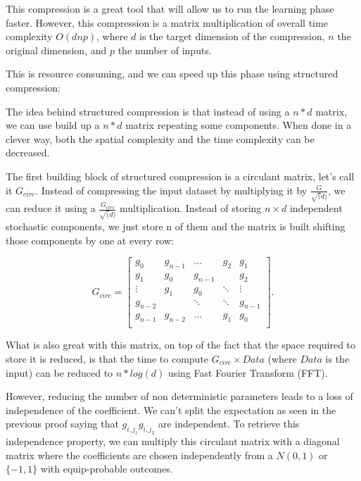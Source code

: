 \documentclass[11pt,a4paper]{article}
\begin{document}
	
	This compression is a great tool that will allow us to run the learning phase faster. However, this compression is a matrix multiplication of overall time complexity $O(dnp)$, where $d$ is the target dimension of the compression, $n$ the original dimension, and $p$ the number of inputs.  
	
	This is resource consuming, and we can speed up this phase using structured compression:
	
	The idea behind structured compression is that instead of using a $n*d$ matrix, we can use build up a $n*d$ matrix repeating some components. When done in a clever way, both the spatial complexity and the time complexity can be decreased.
	
	The first building block of structured compression is a circulant matrix, let's call it $G_{circ}$. Instead of compressing the input dataset by multiplying it by $\frac{G}{\sqrt(d)}$, we can reduce it using a $\frac{G_{circ}}{\sqrt(d)}$ multiplication. Instead of storing $n \times d$ independent stochastic components, we just store n of them and the matrix is built shifting those components by one at every row: 
	
	\begin{equation*}
        G_{circ}=
        \begin{bmatrix}
        g_0     & g_{n-1} & \dots  & g_{2} & g_{1}  \\
        g_{1} & g_0    & g_{n-1} &         & g_{2}  \\
        \vdots  & g_{1}& g_0    & \ddots  & \vdots   \\
        g_{n-2}  &        & \ddots & \ddots  & g_{n-1}   \\
        g_{n-1}  & g_{n-2} & \dots  & g_{1} & g_0 \\
        \end{bmatrix}.
	\end{equation*}

	
	
	What is also great with this matrix, on top of the fact that the space required to store it is reduced, is that the time to compute $G_{circ} \times Data$ (where $Data$ is the input) can be reduced to $n*log(d)$ using Fast Fourier Transform (FFT).
	 
	 
	However, reducing the number of non deterministic parameters leads to a loss of independence of the coefficient. We can't split the expectation as seen in the previous proof saying that $g_{i,j_1} g_{i,j_2}$ are independent. To retrieve this independence property, we can multiply this circulant matrix with a diagonal matrix where the coefficients are chosen independently from a $N(0,1)$ or $\{-1,1\}$ with equip-probable outcomes.
	
\end{document}
